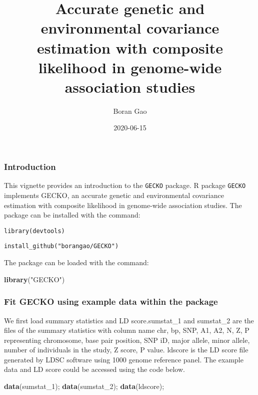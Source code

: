 \documentclass[]{article}
\title{Accurate genetic and environmental covariance estimation with composite
likelihood in genome-wide association studies}
\author{Boran Gao}
\date{2020-06-15}
\newenvironment{Shaded}{\begin{snugshade}}{\end{snugshade}}
\newcommand{\KeywordTok}[1]{\textcolor[rgb]{0.13,0.29,0.53}{\textbf{#1}}}
\newcommand{\DecValTok}[1]{\textcolor[rgb]{0.00,0.00,0.81}{#1}}
\newcommand{\StringTok}[1]{\textcolor[rgb]{0.31,0.60,0.02}{#1}}
\newcommand{\NormalTok}[1]{#1}
\begin{document}
\maketitle

\subsubsection{Introduction}\label{introduction}

This vignette provides an introduction to the \texttt{GECKO} package. R
package \texttt{GECKO} implements GECKO, an accurate genetic and
environmental covariance estimation with composite likelihood in
genome-wide association studies. The package can be installed with the
command:

\texttt{library(devtools)}

\texttt{install\_github("borangao/GECKO")}

The package can be loaded with the command:

\begin{Shaded}
\begin{Highlighting}[]
\KeywordTok{library}\NormalTok{(}\StringTok{"GECKO"}\NormalTok{)}
\end{Highlighting}
\end{Shaded}

\subsubsection{Fit GECKO using example data within the
package}\label{fit-gecko-using-example-data-within-the-package}

We first load summary statistics and LD score.sumstat\_1 and sumstat\_2
are the files of the summary statistics with column name chr, bp, SNP,
A1, A2, N, Z, P representing chromosome, base pair position, SNP iD,
major allele, minor allele, number of individuals in the study, Z score,
P value. ldscore is the LD score file generated by LDSC software using
1000 genome reference panel. The example data and LD score could be
accessed using the code below.

\begin{Shaded}
\begin{Highlighting}[]
\KeywordTok{data}\NormalTok{(sumstat_}\DecValTok{1}\NormalTok{);}
\KeywordTok{data}\NormalTok{(sumstat_}\DecValTok{2}\NormalTok{);}
\KeywordTok{data}\NormalTok{(ldscore);}
\end{Highlighting}
\end{Shaded}
\end{document}

